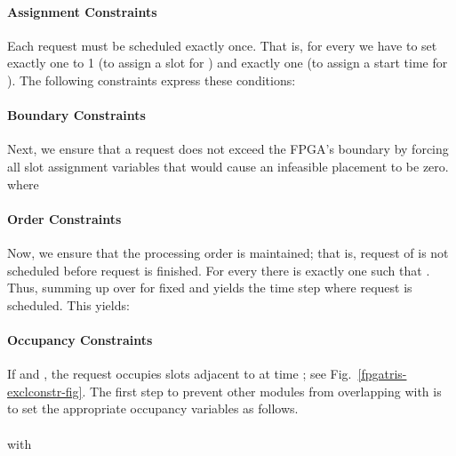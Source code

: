 \documentclass[10pt,journal]{IEEEtran}
\begin{document}
\paragraph{Assignment Constraints} 
Each request must be scheduled exactly once. That is,
for every  we have to set exactly one  to 1 (to assign
a slot for ) and exactly one  (to assign a start time
for ).
The following constraints express these conditions:



\medskip
\paragraph{Boundary Constraints} 
Next, we ensure that a request does not exceed the FPGA's boundary by
forcing all slot assignment variables that would cause an infeasible
placement to be zero.\\
  
where


\medskip
\paragraph{Order Constraints}
Now, we ensure that the processing order is maintained; that is, 
request  of  is not scheduled before
request  is finished.
For every  there is exactly one  such that .
Thus, summing up  over  for fixed  and 
yields the time step where request  is scheduled. This yields:



\medskip
\paragraph{Occupancy Constraints}
If  and , 
the request  occupies  slots adjacent to  at time ;
see Fig.~\ref{fpgatris-exclconstr-fig}.
The first step to prevent other modules from overlapping with  is to
set the appropriate occupancy variables as follows.\\
\\

with 
\end{document}
